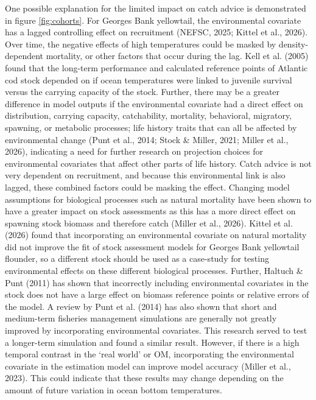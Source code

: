 \documentclass[
  12pt,
]{article}
\begin{document}
One possible explanation for the limited impact on catch advice is demonstrated in figure \ref{fig:cohorts}. For Georges Bank yellowtail, the environmental covariate has a lagged controlling effect on recruitment (NEFSC, 2025; Kittel et al., 2026). Over time, the negative effects of high temperatures could be masked by density-dependent mortality, or other factors that occur during the lag. Kell et al. (2005) found that the long-term performance and calculated reference points of Atlantic cod stock depended on if ocean temperatures were linked to juvenile survival versus the carrying capacity of the stock. Further, there may be a greater difference in model outputs if the environmental covariate had a direct effect on distribution, carrying capacity, catchability, mortality, behavioral, migratory, spawning, or metabolic processes; life history traits that can all be affected by environmental change (Punt et al., 2014; Stock \& Miller, 2021; Miller et al., 2026), indicating a need for further research on projection choices for environmental covariates that affect other parts of life history. Catch advice is not very dependent on recruitment, and because this environmental link is also lagged, these combined factors could be masking the effect. Changing model assumptions for biological processes such as natural mortality have been shown to have a greater impact on stock assessments as this has a more direct effect on spawning stock biomass and therefore catch (Miller et al., 2026). Kittel et al. (2026) found that incorporating an environmental covariate on natural mortality did not improve the fit of stock assessment models for Georges Bank yellowtail flounder, so a different stock should be used as a case-study for testing environmental effects on these different biological processes. Further, Haltuch \& Punt (2011) has shown that incorrectly including environmental covariates in the stock does not have a large effect on biomass reference points or relative errors of the model. A review by Punt et al. (2014) has also shown that short and medium-term fisheries management simulations are generally not greatly improved by incorporating environmental covariates. This research served to test a longer-term simulation and found a similar result. However, if there is a high temporal contrast in the `real world' or OM, incorporating the environmental covariate in the estimation model can improve model accuracy (Miller et al., 2023). This could indicate that these results may change depending on the amount of future variation in ocean bottom temperatures.
\end{document}
